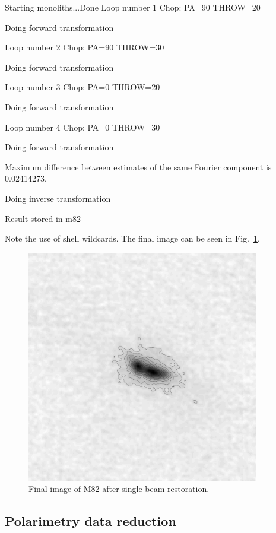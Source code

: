 \documentclass[twoside,11pt]{starlink}
\begin{document}
\begin{terminalv}
Starting monoliths...Done
Loop number 1
Chop: PA=90 THROW=20

Doing forward transformation

Loop number 2
Chop: PA=90 THROW=30

Doing forward transformation

Loop number 3
Chop: PA=0 THROW=20

Doing forward transformation

Loop number 4
Chop: PA=0 THROW=30

Doing forward transformation

Maximum difference between estimates of the same Fourier component is
0.02414273.

Doing inverse transformation

Result stored in m82
%
\end{terminalv}
Note the use of shell wildcards. The final image can be seen in
Fig.\ \ref{m82:final}.



\begin{figure}
\begin{center}
\includegraphics[width=4in]{sun216_m82_remdbm}
\caption{Final image of M82 after single beam restoration.}
\label{m82:final}
\end{center}
\end{figure}


\subsection{Polarimetry data reduction\label{scupol}}
\end{document}
